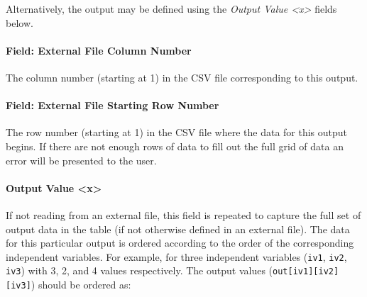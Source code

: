 Alternatively, the output may be defined using the \emph{Output Value
\textless{}x\textgreater{}} fields below.

\paragraph{Field: External File Column
Number}\label{field-external-file-column-number}

The column number (starting at 1) in the CSV file corresponding to this
output.

\paragraph{Field: External File Starting Row
Number}\label{field-external-file-starting-row-number}

The row number (starting at 1) in the CSV file where the data for this
output begins. If there are not enough rows of data to fill out the full
grid of data an error will be presented to the user.

\paragraph{Output Value
\textless{}x\textgreater{}}\label{output-value-x}

If not reading from an external file, this field is repeated to capture
the full set of output data in the table (if not otherwise defined in an
external file). The data for this particular output is ordered according
to the order of the corresponding independent variables. For example,
for three independent variables (\texttt{iv1}, \texttt{iv2},
\texttt{iv3}) with 3, 2, and 4 values respectively. The output values
(\texttt{out{[}iv1{]}{[}iv2{]}{[}iv3{]}}) should be ordered as:

